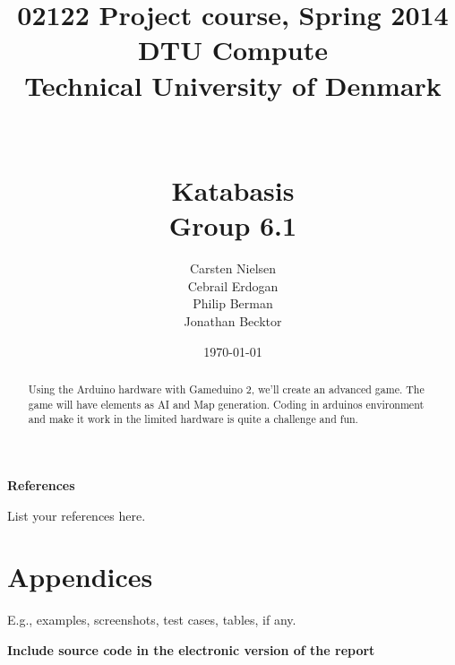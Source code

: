\documentclass[12pt]{report}
\title{02122 Project course, Spring 2014 \\
DTU Compute \\
Technical University of Denmark \\~\\~\\ Katabasis \\ Group 6.1}
\author{Carsten Nielsen  \\
        Cebrail Erdogan \\
        Philip Berman   \\
        Jonathan Becktor\\  }
\date{\today}
\begin{document}
\maketitle

\begin{abstract}
Using the Arduino hardware with Gameduino 2, we’ll create an advanced game.
The game will have elements as AI and Map generation.
Coding in arduinos environment and make it work in the
limited hardware is quite a challenge and fun.
\end{abstract}


\tableofcontents

\newpage



\newpage

















\newpage

\textbf{References}

List your references here.

\newpage


\chapter{Appendices}

 E.g., examples, screenshots, test cases, tables, if any.

\textbf{Include source code in the electronic version of the report}
\end{document}
